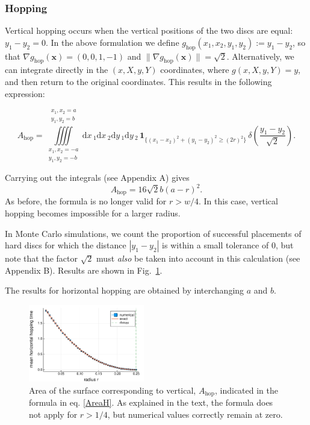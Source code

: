 \documentclass[superscriptaddress,pre,reprint,showpacs,twocolumn]{revtex4-1}
\newcommand{\rd}[1]{\mathrm{d}{#1} \,}
\newcommand{\indicatorsymbol}{\mathbf{1}}
\newcommand{\indicator}[1]{\indicatorsymbol_{ \{   #1 \} } }
\begin{document}
\subsubsection{Hopping}

Vertical hopping occurs when the vertical positions of the two discs are equal: $y_1 - y_2=0$. In the above formulation we define
 $g_\mathrm{hop}(x_1, x_2, y_1, y_2) := y_1 - y_2$, so that $\nabla g_\mathrm{hop}(\mathbf{x}) = (0, 0, 1, -1)$ and $ \| \nabla g_\mathrm{hop}(\mathbf{x}) \| = \sqrt{2}$. 
 Alternatively, we can integrate 
directly in the $(x,X,y,Y)$ coordinates, where
$g(x,X,y,Y) = y$, and then return to the original coordinates. This results in the following expression:
\begin{widetext}
\begin{equation}
  A_\text{hop} =
\iiiint
\limits_{\substack{x_1, x_2 = -a \\ y_1, y_2 = -b}}^{\substack{x_1, x_2 = a \\ y_1, y_2 = b}}
\rd x_1 \rd x_2 \rd y_1 \rd y_2 
 \, \indicator{ (x_1-x_2)^2 + (y_1-y_2)^2 \ge (2r)^2 } \, \delta \left(\frac{y_1-y_2}{\sqrt{2}} \right).
\end{equation}
\end{widetext}
Carrying out the integrals  (see Appendix A) gives
 \begin{equation}\label{AreaH}
 A_\text{hop}  =  16 \sqrt{2} b(a-r)^2.
\end{equation}
As before, the formula is no longer valid for $r > w/4$. In this case,
vertical hopping becomes impossible for a larger radius.

In Monte Carlo simulations, we count the proportion of successful placements of hard discs 
for which the distance 
$|y_1 - y_2|$ is within a small tolerance of $0$, but note that the factor $\sqrt{2}$ must \emph{also} be taken into account in this calculation (see Appendix B).
Results are shown in Fig.~\ref{AreaHopp01}.

The results for horizontal hopping are obtained by interchanging $a$ and $b$.

\begin{figure}[h]
\centering
\includegraphics[width=0.45\textwidth]{./figures/AreaHop01.pdf}
\caption{Area of the surface corresponding to vertical, $A_\text{hop}$, 
  indicated in the formula in eq. \ref{AreaH}. As explained 
in the text, the formula does not apply for $r>1/4$, but numerical values correctly
remain at zero.}
\label{AreaHopp01}
\end{figure}
\end{document}
